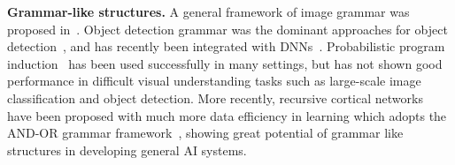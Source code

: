\documentclass[10pt,twocolumn,letterpaper]{article}
\begin{document}



\textbf{Grammar-like structures.} A general framework of image grammar was proposed in~\cite{Zhu_Grammar}. Object detection grammar was the dominant approaches for object detection~\cite{Pff_Grammar,Yuille_AndOr,DisAOT-CVPR,AOGShape,StochasticGrammar}, and has recently been integrated with DNNs~\cite{YingWu_CompositionalPose,YingWu_CompositionalModel}. Probabilistic program induction~\cite{ProbabilisticPrograming,lake15science,BuildMachineLikePeople} has been used successfully in many settings, but has not shown good performance in difficult visual understanding tasks such as large-scale image classification and object detection. More recently, recursive cortical networks~\cite{RCN} have been proposed with much more data efficiency in learning which adopts the AND-OR grammar framework~\cite{Zhu_Grammar}, showing great potential of grammar like structures in developing general AI systems. 
\end{document}

